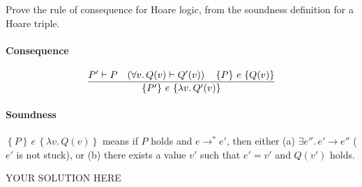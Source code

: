 \documentclass[11pt,twoside]{exam}
\def\num#1{\overline{#1}}
\def\fun#1{\lambda #1.\,}
\def\hoare#1#2#3{\left\{#1\right\} \, #2 \, \left\{#3\right\}}
\def\entails{\vdash}
\def\lift#1{\lceil #1 \rceil}
\def\sep{\mathbin{\raisebox{1pt}{$\star$}}}
\def\pointsto{\mapsto}
\begin{document}
\begin{questions}

\question[5]
Prove the rule of consequence for Hoare logic, from the soundness definition for
a Hoare triple.

\paragraph{Consequence}
\[
  \frac{P' \entails P \quad (\forall v.\, Q(v) \entails Q'(v)) \quad \hoare{P}{e}{Q(v)}}{%
  \hoare{P'}{e}{\fun{v} Q'(v)}
  }
\]

\paragraph{Soundness}
$\hoare{P}{e}{\fun{v} Q(v)}$ means if $P$ holds and $e \to^* e'$, then either
(a) $\exists e''.\, e' \to e''$ ($e'$ is not stuck), or (b) there exists a value
$v'$ such that $e' = v'$ and $Q(v')$ holds.

\begin{solution}
  YOUR SOLUTION HERE
\end{solution}


\end{questions}
\end{document}
